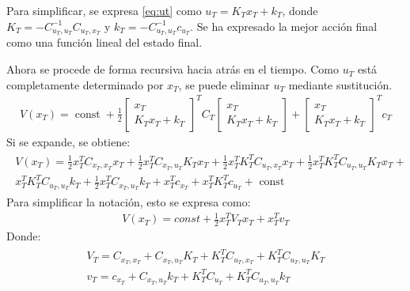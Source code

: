 Para simplificar, se expresa \ref{eq:ut} como $u_T=K_Tx_T+k_T$, donde
$K_T=-C^{-1}_{u_T,u_T}C_{u_T,x_T}$ y  $k_T=-C^{-1}_{u_T,u_T}c_{u_T}$. Se ha expresado la mejor
acción final como una función lineal del estado final.

Ahora se procede de forma recursiva hacia atrás en el tiempo. Como  $u_T$ está completamente
determinado por $x_T$, se puede eliminar $u_T$ mediante sustitución.
\begin{align}
    \label{eq:Vshoot}
V ( x _ { T } ) = \operatorname { const } + \frac { 1 } { 2 } \left[ \begin{array} { c } { x _ { T } } \\ { K _ { T } x _ { T } + k _ { T } } \end{array} \right] ^ { T } C _ { T } \left[ \begin{array} { c } { x _ { T } } \\ { K _ { T } x _ { T } + k _ { T } } \end{array} \right] + \left[ \begin{array} { c } { x _ { T } } \\ { K _ { T } x _ { T } + k _ { T } } \end{array} \right] ^ { T } c _ { T }
\end{align}
Si se expande, se obtiene:
\begin{align}
\left. \begin{array}{l}{ V ( x _ { T } ) = \frac { 1 } { 2 } x _ { T } ^ { T } C _ { x _ { T } , x _ { T } } x _ { T } + \frac { 1 } { 2 } x _ { T } ^ { T } C _ { x _ { T } , u _ { T } } K _ { T } x _ { T } + \frac { 1 } { 2 } x _ { T } ^ { T } K _ { T } ^ { T } C _ { u _ { T } , x _ { T } } x _ { T } + \frac { 1 } { 2 } x _ { T } ^ { T } K _ { T } ^ { T } C _ { u _ { T } , u _ { T } } K _ { T } x _ { T } + }\\{ x _ { T } ^ { T } K _ { T } ^ { T } C _ { u _ { T } , u _ { T } } k _ { T } + \frac { 1 } { 2 } x _ { T } ^ { T } C _ { x _ { T } , u _ { T } } k _ { T } + x _ { T } ^ { T } c _ { x _ { T } } + x _ { T } ^ { T } K _ { T } ^ { T } c _ { u _ { T } } + \text { const } }\end{array} \right.
\end{align}
Para simplificar la notación, esto se expresa como:
\begin{align}
V ( x _ { T } ) = const + \frac { 1 } { 2 } x _ { T } ^ { T } V _ { T } x _ { T } + x _ { T } ^ { T } v _ { T }
\end{align}
Donde:
\begin{align}
\left. \begin{array} { l } { V _ { T } = C _ { x _ { T } , x _ { T } } + C _ { x _ { T } , u _ { T } } K _ { T } + K _ { T } ^ { T } C _ { u _ { T } , x _ { T } } + K _ { T } ^ { T } C _ { u _ { T } , u _ { T } } K _ { T } } \\ { v _ { T } = c _ { x _ { T } } + C _ { x _ { T } , u _ { T } } k _ { T } + K _ { T } ^ { T } C _ { u _ { T } } + K _ { T } ^ { T } C _ { u _ { T } , u _ { T } } k _ { T } } \end{array} \right.
\end{align}

